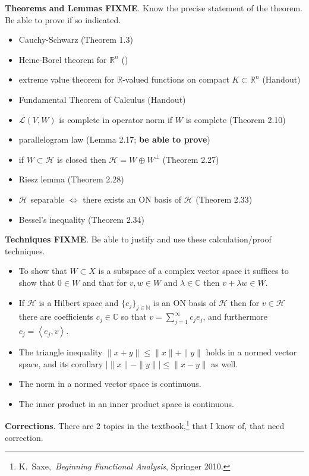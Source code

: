 \documentclass[12pt]{amsart}
\newcommand{\normalspacing}{\renewcommand{\baselinestretch}{1.1}\tiny\normalsize}
\newcommand{\cH}{\mathcal{H}}
\newcommand{\cL}{\mathcal{L}}
\newcommand{\CC}{{\mathbb{C}}}
\newcommand{\RR}{{\mathbb{R}}}
\newcommand{\NN}{{\mathbb{N}}}
\newcommand{\ip}[2]{\left<#1,#2\right>}
\newcommand{\ds}{\displaystyle}
\newcommand{\textbook}{K.~Saxe,~\emph{Beginning Functional Analysis}, Springer 2010.}
\begin{document}
\normalspacing
\medskip
\noindent \textbf{Theorems and Lemmas FIXME}.  Know the precise statement of the theorem.  Be able to prove if so indicated.
\begin{itemize}
\item Cauchy-Schwarz (Theorem 1.3)
\item Heine-Borel theorem for $\RR^n$ ()
\item extreme value theorem for $\RR$-valued functions on compact $K\subset \RR^n$ (Handout)
\item Fundamental Theorem of Calculus (Handout)
\item $\cL(V,W)$ is complete in operator norm if $W$ is complete (Theorem 2.10)
\item parallelogram law (Lemma 2.17; \textbf{be able to prove})
\item if $W\subset \cH$ is closed then $\cH = W\oplus W^\perp$ (Theorem 2.27)
\item Riesz lemma (Theorem 2.28)
\item $\cH$ separable $\iff$ there exists an ON basis of $\cH$ (Theorem 2.33)
\item Bessel's inequality (Theorem 2.34)
\end{itemize}

\normalspacing
\medskip
\noindent \textbf{Techniques FIXME}.  Be able to justify and use these calculation/proof techniques.
\begin{itemize}
\item To show that $W\subset X$ is a subspace of a complex vector space it suffices to show that $0\in W$ and that for $v,w\in W$ and $\lambda \in \CC$ then $v + \lambda w \in W$.
\item If $\cH$ is a Hilbert space and $\{e_j\}_{j\in\NN}$ is an ON basis of $\cH$ then for $v\in\cH$  there are coefficients $c_j\in\CC$ so that $\ds v = \sum_{j=1}^\infty c_j e_j$, and furthermore $c_j=\ip{e_j}{v}$.
\item The triangle inequality $\|x+y\|\le \|x\|+\|y\|$ holds in a normed vector space, and its corollary $\big|\|x\|-\|y\|\big| \le \|x-y\|$ as well.
\item The norm in a normed vector space is continuous.
\item The inner product in an inner product space is continuous.
\end{itemize}

\normalspacing
\medskip
\noindent \textbf{Corrections}.  There are 2 topics in the textbook,\footnote{\textbook} that I know of, that need correction.
\end{document}

